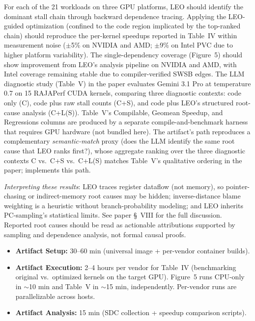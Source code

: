 \documentclass[conference]{IEEEtran}
\begin{document}
For each of the 21 workloads on three GPU platforms, LEO should identify the dominant stall chain through backward dependence tracing. Applying the LEO-guided optimization (confined to the code region implicated by the top-ranked chain) should reproduce the per-kernel speedups reported in Table~IV within measurement noise ($\pm$5\% on NVIDIA and AMD; $\pm$9\% on Intel PVC due to higher platform variability).
The single-dependency coverage (Figure~5) should show improvement from LEO's analysis pipeline on NVIDIA and AMD, with Intel coverage remaining stable due to compiler-verified SWSB edges.
The LLM diagnostic study (Table~V) in the paper evaluates Gemini 3.1 Pro at temperature 0.7 on 15 RAJAPerf CUDA kernels, comparing three diagnostic contexts: code only (C), code plus raw stall counts (C+S), and code plus LEO's structured root-cause analysis (C+L(S)). Table~V's Compilable, Geomean Speedup, and Regressions columns are produced by a separate compile-and-benchmark harness that requires GPU hardware (not bundled here). The artifact's  path reproduces a complementary \emph{semantic-match} proxy (does the LLM identify the same root cause that LEO ranks first?), whose aggregate ranking over the three diagnostic contexts C vs.\ C+S vs.\ C+L(S) matches Table~V's qualitative ordering in the paper;  implements this path.

\emph{Interpreting these results}: LEO traces register dataflow (not memory), so pointer-chasing or indirect-memory root causes may be hidden; inverse-distance blame weighting is a heuristic without branch-probability modeling; and LEO inherits PC-sampling's statistical limits. See paper \S~VIII for the full discussion. Reported root causes should be read as actionable attributions supported by sampling and dependence analysis, not formal causal proofs.

\arttime

\begin{itemize}
\item \textbf{Artifact Setup:} 30--60 min (universal image + per-vendor container builds).
\item \textbf{Artifact Execution:} 2--4 hours per vendor for Table~IV (benchmarking original vs.\ optimized kernels on the target GPU). Figure~5 runs CPU-only in $\sim$10 min and Table~V in $\sim$15 min, independently. Per-vendor runs are parallelizable across hosts.
\item \textbf{Artifact Analysis:} 15 min (SDC collection + speedup comparison scripts).
\end{itemize}
\end{document}
